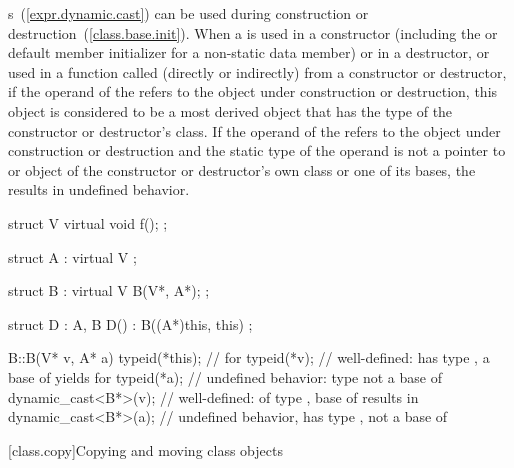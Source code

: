 \pnum
{}%
%
%
%
s~(\ref{expr.dynamic.cast}) can be used during construction
or destruction~(\ref{class.base.init}). When a
is used in a constructor (including the
 or default member initializer
for a non-static data member)
or in a destructor, or used in a function called (directly or indirectly) from
a constructor or destructor, if the operand of the
refers to the object under construction or destruction, this object is
considered to be a most derived object that has the type of the constructor or
destructor's class.
If the operand of the
refers to the object under construction or destruction and the static type of
the operand is not a pointer to or object of the constructor or destructor's
own class or one of its bases, the
results in undefined behavior.
\begin{example}
\begin{codeblock}
struct V {
  virtual void f();
};

struct A : virtual V { };

struct B : virtual V {
  B(V*, A*);
};

struct D : A, B {
  D() : B((A*)this, this) { }
};

B::B(V* v, A* a) {
  typeid(*this);                //  for 
  typeid(*v);                   // well-defined:  has type , a base of  yields  for 
  typeid(*a);                   // undefined behavior: type  not a base of 
  dynamic_cast<B*>(v);          // well-defined:  of type ,  base of  results in 
  dynamic_cast<B*>(a);          // undefined behavior,  has type ,  not a base of 
}
\end{codeblock}
\end{example}
%
%

[class.copy]{Copying and moving class objects}%
%
%
%

